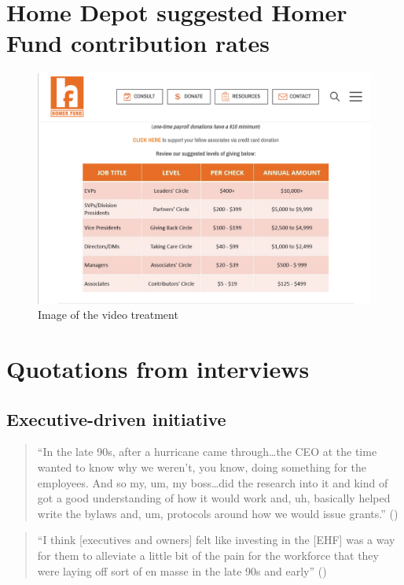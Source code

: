 \documentclass[
  11pt,
  oneside]{article}
\begin{document}
\newpage

\appendix


\section{Home Depot suggested Homer Fund contribution rates}\label{home-depot-suggested-homer-fund-contribution-rates}

\begin{figure}
\includegraphics[width=0.6\linewidth]{plots/HF_donation_suggestions} \caption{Image of the video treatment}\label{fig:fig-sugdon}
\end{figure}

\section{Quotations from interviews}\label{app-interviews}

\subsection{Executive-driven initiative}\label{executive-driven-initiative}

\begin{quote}
``In the late 90s, after a hurricane came through\ldots the CEO at the time wanted to know why we weren't, you know, doing something for the employees. And so my, um, my boss\ldots did the research into it and kind of got a good understanding of how it would work and, uh, basically helped write the bylaws and, um, protocols around how we would issue grants.'' ()
\end{quote}

\begin{quote}
``I think {[}executives and owners{]} felt like investing in the {[}EHF{]} was a way for them to alleviate a little bit of the pain for the workforce that they were laying off sort of en masse in the late 90s and early'' ()
\end{quote}
\end{document}
